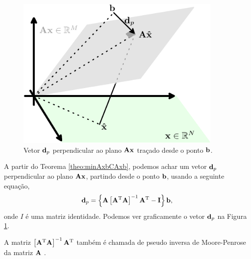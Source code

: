 \begin{corollary} 
\label{coro:minAxbCAxb1} ~

\noindent
\begin{minipage}{0.49\textwidth}
\centering
\begin{minipage}{0.93\textwidth}
     \begin{figure}[H]
         \centering
         \includegraphics[width=0.9\textwidth]{chapters/minimization-fx/minimo-linear1.eps}
         \caption{Vetor $\VECTOR{d}_p$ perpendicular ao plano 
$\MATRIX{A}\VECTOR{x}$ traçado desde o ponto $\VECTOR{b}$. }
         \label{fig:coro:minAxbCAxb1:a}
     \end{figure}
\end{minipage}
\end{minipage}
\begin{minipage}{0.49\textwidth}
A partir do Teorema \ref{theo:minAxbCAxb}, 
podemos achar um vetor $\VECTOR{d}_p$ perpendicular ao plano $\MATRIX{A}\VECTOR{x}$,
partindo desde o ponto $\VECTOR{b}$, usando a seguinte equação,
\begin{equation}
\VECTOR{d}_p = \left\{\MATRIX{A}\left[ \MATRIX{A}^{\transpose}\MATRIX{A} \right]^{-1}\MATRIX{A}^{\transpose}- \MATRIX{I}\right\}\VECTOR{b},
\end{equation}
onde $I$ é uma matriz identidade.
Podemos ver graficamente o vetor $\VECTOR{d}_p$ na Figura \ref{fig:coro:minAxbCAxb1:a}.
\begin{tcbattention}
A matriz $\left[ \MATRIX{A}^{\transpose}\MATRIX{A} \right]^{-1}\MATRIX{A}^{\transpose}$
também é chamada de pseudo inversa de Moore-Penrose da matriz $\MATRIX{A}$ \cite[pp. 290]{golub2013matrix}.
\end{tcbattention}
\end{minipage}
\end{corollary}

